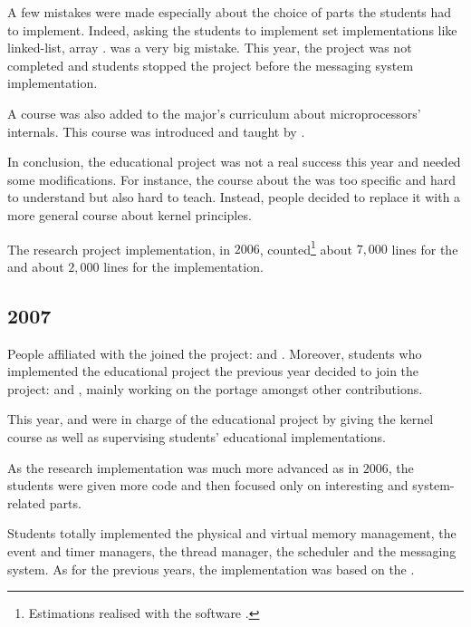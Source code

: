 \begin{multicols}{2}
A few mistakes were made especially about the choice of parts the students
had to implement. Indeed, asking the students to implement set implementations
like linked-list, array \etc{}. was a very big mistake. This year, the project
was not completed and students stopped the project before the messaging
system implementation.

A course was also added to the   major's curriculum about microprocessors' internals. This
course was introduced and taught by .

In conclusion, the  educational project was not a real success
this year and needed some modifications. For instance, the course about the
 was too specific and hard to understand but
also hard to teach. Instead,  people decided to replace it with
a more general course about kernel principles.

The  research project implementation, in $2006$,
  counted\footnote{Estimations realised with the software .}
about $7,000$ lines for the  and about $2,000$ lines for the
 implementation.

%
%

\subsection{2007}

People affiliated with the  joined
the project:  and . Moreover,
students who implemented the  educational project the previous
year decided to join the project:  and , mainly working on the  portage amongst
other contributions.

This year,  and  were in
charge of the educational project by giving the kernel course as well
as supervising students' educational implementations.

As the  research implementation was much more advanced as in
$2006$, the students were given more code and then focused only on interesting
and system-related parts.

Students totally implemented the physical and virtual memory management, the
event and timer managers, the thread manager, the scheduler and the messaging
system. As for the previous years, the implementation was based on the
.


\end{multicols}
